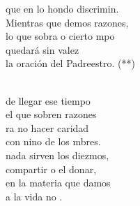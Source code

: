 \documentclass[12pt]{article}
\begin{document}
\begin{multicols*}{2}
\begin{cancion}
	que en lo hondo discrimin.\\
Mientras que demos razones, \\
	lo que sobra o cierto mpo\\
	quedará sin valez \\
	la oración del Padreestro. (**)\\\jump\\
	\begin{chorus}%
	de llegar ese tiempo \\
	el que sobren razones\\
	ra no hacer caridad \\
	con nino de los mbres.\\
	nada sirven los diezmos,\\
	compartir o el donar,\\
	 en la materia que damos\\
	a la vida no .   \\
	\end{chorus}%
	\jump\\
\end{cancion}%


\end{multicols*}
\end{document}
